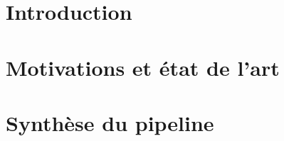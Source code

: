 \documentclass[language=fr, year=2A, enterprise=ensIIE]{ensiie-report}
\begin{document}

\renewcommand{\listfigurename}{Liste des figures}
\listoffigures\label{sec:lof}
\newpage


\renewcommand{\contentsname}{Table des matières}
\tableofcontents
\label{EndFirstPages} %
\newpage


\pagestyle{MainPages}

\section{Introduction}\label{sec:introduction}


\newpage


\section{Motivations et état de l'art}\label{sec:motivations_etat_art}


\newpage


\section{Synthèse du pipeline}\label{sec:synthese_pipeline}


\newpage
\end{document}
